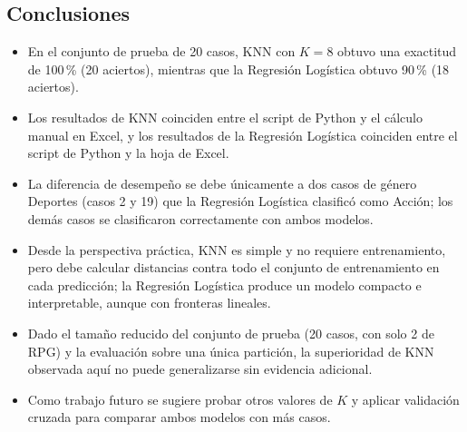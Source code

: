 \documentclass[]{article}
\begin{document}
\subsection{Conclusiones}

\begin{itemize}
  \item En el conjunto de prueba de 20 casos, KNN con $K=8$ obtuvo una exactitud de 100\,\% (20 aciertos), mientras que la Regresión Logística obtuvo 90\,\% (18 aciertos).
  \item Los resultados de KNN coinciden entre el script de Python y el cálculo manual en Excel, y los resultados de la Regresión Logística coinciden entre el script de Python y la hoja de Excel.
  \item La diferencia de desempeño se debe únicamente a dos casos de género Deportes (casos 2 y 19) que la Regresión Logística clasificó como Acción; los demás casos se clasificaron correctamente con ambos modelos.
  \item Desde la perspectiva práctica, KNN es simple y no requiere entrenamiento, pero debe calcular distancias contra todo el conjunto de entrenamiento en cada predicción; la Regresión Logística produce un modelo compacto e interpretable, aunque con fronteras lineales.
  \item Dado el tamaño reducido del conjunto de prueba (20 casos, con solo 2 de RPG) y la evaluación sobre una única partición, la superioridad de KNN observada aquí no puede generalizarse sin evidencia adicional.
  \item Como trabajo futuro se sugiere probar otros valores de $K$ y aplicar validación cruzada para comparar ambos modelos con más casos.
\end{itemize}
\end{document}
